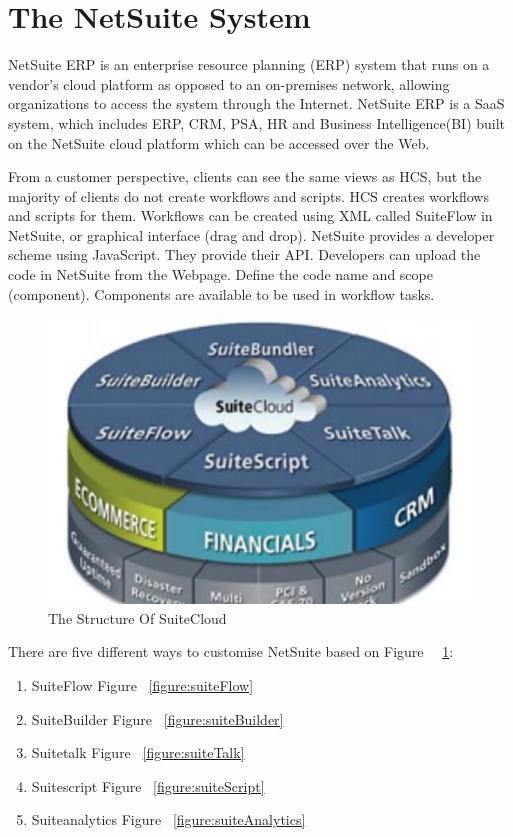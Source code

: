\section{The NetSuite System}

NetSuite ERP is an enterprise resource planning (ERP) system that runs on a vendor’s cloud platform as opposed to an on-premises network, allowing organizations to access the system through the Internet. NetSuite ERP is a SaaS system, which includes ERP, CRM, PSA, HR and Business Intelligence(BI) built on the NetSuite cloud platform which can be accessed over the Web. \par

From a customer perspective, clients can see the same views as HCS, but the majority of clients do not create workflows and scripts. HCS creates workflows and scripts for them.
Workflows can be created using XML called SuiteFlow in NetSuite, or graphical interface (drag and drop). NetSuite provides a developer scheme using JavaScript. They provide their API. Developers can upload the code in NetSuite from the Webpage. Define the code name and scope (component). Components are available to be used in workflow tasks.\par


\begin{figure}[!htb]
    \centering 
    \includegraphics[scale=0.7]{resource/StructureOfSuiteCloud.jpg}
    \caption{The Structure Of SuiteCloud}
    \label{figure:structureSuiteCloud}
\end{figure}




There are five different ways to customise NetSuite based on Figure ~~\ref{figure:structureSuiteCloud}:
\begin{enumerate}
\item SuiteFlow  Figure ~\ref{figure:suiteFlow}
\item SuiteBuilder  Figure ~\ref{figure:suiteBuilder}
\item Suitetalk Figure ~\ref{figure:suiteTalk}
\item Suitescript Figure ~\ref{figure:suiteScript}
\item Suiteanalytics Figure ~\ref{figure:suiteAnalytics}
\end{enumerate}


